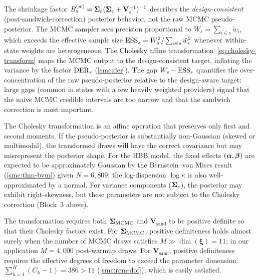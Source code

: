 
\begin{remark}
\label{smc:rem-mcmc-vs-design}
  The shrinkage factor
  $B_s^{(w)}
  = \boldsymbol{\Sigma}_\varepsilon(\boldsymbol{\Sigma}_\varepsilon + \mathbf{V}_s^{-1})^{-1}$
  describes the \emph{design-consistent} (post-sandwich-correction)
  posterior behavior, not the raw MCMC pseudo-posterior.  The MCMC
  sampler sees precision proportional to
  $W_s = \sum_{i \in s}\tilde{w}_i$, which exceeds the effective
  sample size $\text{ESS}_s = W_s^2 / \sum_{i \in s}\tilde{w}_i^2$ whenever
  within-state weights are heterogeneous.  The Cholesky affine
  transformation~\eqref{eq:cholesky-transform} maps the MCMC output to
  the design-consistent target, inflating the variance by the factor
  $\operatorname{DER}_s$ (\cref{smc:der}).  The gap $W_s - \text{ESS}_s$ quantifies the
  over-concentration of the raw pseudo-posterior relative to the
  design-aware target\textup{:} large gaps (common in states with a
  few heavily weighted providers) signal that the naive MCMC credible
  intervals are too narrow and that the sandwich correction is most
  important.
\end{remark}


\begin{remark}
\label{smc:rem-nongaussian}
  The Cholesky transformation is an affine operation that preserves
  only first and second moments.  If the pseudo-posterior is
  substantially non-Gaussian (skewed or multimodal), the transformed
  draws will have the correct covariance but may misrepresent the
  posterior shape.  For the HBB model, the fixed effects
  $(\boldsymbol{\alpha},\boldsymbol{\beta})$ are expected to be approximately Gaussian by the
  Bernstein--von Mises result (\cref{smc:thm-bvm}) given
  $N = 6{,}809$; the log-dispersion $\log\kappa$ is also
  well-approximated by a normal.  For variance components
  ($\boldsymbol{\Sigma}_\varepsilon$), the posterior may exhibit right-skewness,
  but these parameters are not subject to the Cholesky correction
  (Block~3 above).
\end{remark}

\begin{remark}
\label{smc:rem-posdef}
  The transformation requires both $\boldsymbol{\Sigma}_{\mathrm{MCMC}}$ and
  $\mathbf{V}_{\mathrm{sand}}$ to be positive definite so that their
  Cholesky factors exist.  For $\boldsymbol{\Sigma}_{\mathrm{MCMC}}$, positive
  definiteness holds almost surely when the number of MCMC draws
  satisfies $M \gg \dim(\boldsymbol{\xi}) = 11$; in our application
  $M = 4{,}000$ post-warmup draws.  For
  $\mathbf{V}_{\mathrm{sand}}$, positive definiteness requires the
  effective degrees of freedom to exceed the parameter dimension:
  $\sum_{h=1}^{H}(C_h - 1) = 386 > 11$ (\cref{smc:rem-dof}), which
  is easily satisfied.
\end{remark}
